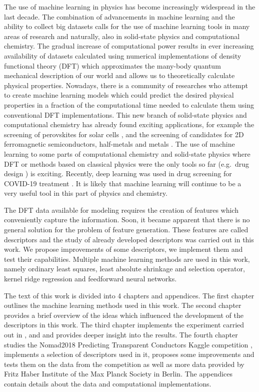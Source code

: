 \documentclass[11pt,oneside,czech,american]{book} %
\theoremstyle{definition} %
\theoremstyle{definition}
\begin{document}
The use of machine learning in physics has become increasingly widespread in the last decade. The combination of advancements in machine learning and the ability to collect big datasets calls for the use of machine learning tools in many areas of research and naturally, also in solid-state physics and computational chemistry. The gradual increase of computational power results in ever increasing availability of datasets calculated using numerical implementations of density functional theory (DFT) which approximates the many-body quantum mechanical description of our world and allows us to theoretically calculate physical properties. Nowadays, there is a community of researches who attempt to create machine learning models which could predict the desired physical properties in a fraction of the computational time needed to calculate them using conventional DFT implementations. This new branch of solid-state physics and computational chemistry has already found exciting applications, for example the screening of perovskites for solar cells \parencite{im19}, \parencite{li19} and the screening of candidates for 2D ferromagnetic semiconductors, half-metals and metals \parencite{lu20}. The use of machine learning to some parts of computational chemistry and solid-state physics where DFT or methods based on classical physics were the only tools so far (e.g.\ drug design \parencite{segall12}) is exciting. Recently, deep learning was used in drug screening for COVID-19 treatment \parencite{saravanan21}. It is likely that machine learning will continue to be a very useful tool in this part of physics and chemistry.

The DFT data available for modeling requires the creation of features which conveniently capture the information. Soon, it became apparent that there is no general solution for the problem of feature generation. These features are called descriptors and the study of already developed descriptors was carried out in this work. We propose improvements of some descriptors, we implement them and test their capabilities. Multiple machine learning methods are used in this work, namely ordinary least squares, least absolute shrinkage and selection operator, kernel ridge regression and feedforward neural networks.

The text of this work is divided into 4 chapters and appendices. The first chapter outlines the machine learning methods used in this work. The second chapter provides a brief overview of the ideas which influenced the development of the descriptors in this work. The third chapter implements the experiment carried out in \parencite{ghiringhelli15}, \parencite{ghiringhelli15_supplementary} and \parencite{ghiringhelli17} and provides deeper insight into the results. The fourth chapter studies the Nomad2018 Predicting Transparent Conductors Kaggle competition \parencite{sutton18}, \parencite{sutton19} implements a selection of descriptors used in it, proposes some improvements and tests them on the data from the competition as well as more data provided by Fritz Haber Institute of the Max Planck Society in Berlin. The appendices contain details about the data and computational implementations.
\end{document}
